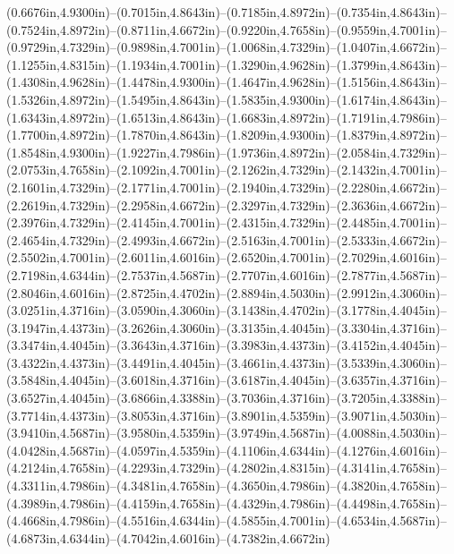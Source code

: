 (0.6676in,4.9300in)--(0.7015in,4.8643in)--(0.7185in,4.8972in)--(0.7354in,4.8643in)--(0.7524in,4.8972in)--(0.8711in,4.6672in)--(0.9220in,4.7658in)--(0.9559in,4.7001in)--(0.9729in,4.7329in)--(0.9898in,4.7001in)--(1.0068in,4.7329in)--(1.0407in,4.6672in)--(1.1255in,4.8315in)--(1.1934in,4.7001in)--(1.3290in,4.9628in)--(1.3799in,4.8643in)--(1.4308in,4.9628in)--(1.4478in,4.9300in)--(1.4647in,4.9628in)--(1.5156in,4.8643in)--(1.5326in,4.8972in)--(1.5495in,4.8643in)--(1.5835in,4.9300in)--(1.6174in,4.8643in)--(1.6343in,4.8972in)--(1.6513in,4.8643in)--(1.6683in,4.8972in)--(1.7191in,4.7986in)--(1.7700in,4.8972in)--(1.7870in,4.8643in)--(1.8209in,4.9300in)--(1.8379in,4.8972in)--(1.8548in,4.9300in)--(1.9227in,4.7986in)--(1.9736in,4.8972in)--(2.0584in,4.7329in)--(2.0753in,4.7658in)--(2.1092in,4.7001in)--(2.1262in,4.7329in)--(2.1432in,4.7001in)--(2.1601in,4.7329in)--(2.1771in,4.7001in)--(2.1940in,4.7329in)--(2.2280in,4.6672in)--(2.2619in,4.7329in)--(2.2958in,4.6672in)--(2.3297in,4.7329in)--(2.3636in,4.6672in)--(2.3976in,4.7329in)--(2.4145in,4.7001in)--(2.4315in,4.7329in)--(2.4485in,4.7001in)--(2.4654in,4.7329in)--(2.4993in,4.6672in)--(2.5163in,4.7001in)--(2.5333in,4.6672in)--(2.5502in,4.7001in)--(2.6011in,4.6016in)--(2.6520in,4.7001in)--(2.7029in,4.6016in)--(2.7198in,4.6344in)--(2.7537in,4.5687in)--(2.7707in,4.6016in)--(2.7877in,4.5687in)--(2.8046in,4.6016in)--(2.8725in,4.4702in)--(2.8894in,4.5030in)--(2.9912in,4.3060in)--(3.0251in,4.3716in)--(3.0590in,4.3060in)--(3.1438in,4.4702in)--(3.1778in,4.4045in)--(3.1947in,4.4373in)--(3.2626in,4.3060in)--(3.3135in,4.4045in)--(3.3304in,4.3716in)--(3.3474in,4.4045in)--(3.3643in,4.3716in)--(3.3983in,4.4373in)--(3.4152in,4.4045in)--(3.4322in,4.4373in)--(3.4491in,4.4045in)--(3.4661in,4.4373in)--(3.5339in,4.3060in)--(3.5848in,4.4045in)--(3.6018in,4.3716in)--(3.6187in,4.4045in)--(3.6357in,4.3716in)--(3.6527in,4.4045in)--(3.6866in,4.3388in)--(3.7036in,4.3716in)--(3.7205in,4.3388in)--(3.7714in,4.4373in)--(3.8053in,4.3716in)--(3.8901in,4.5359in)--(3.9071in,4.5030in)--(3.9410in,4.5687in)--(3.9580in,4.5359in)--(3.9749in,4.5687in)--(4.0088in,4.5030in)--(4.0428in,4.5687in)--(4.0597in,4.5359in)--(4.1106in,4.6344in)--(4.1276in,4.6016in)--(4.2124in,4.7658in)--(4.2293in,4.7329in)--(4.2802in,4.8315in)--(4.3141in,4.7658in)--(4.3311in,4.7986in)--(4.3481in,4.7658in)--(4.3650in,4.7986in)--(4.3820in,4.7658in)--(4.3989in,4.7986in)--(4.4159in,4.7658in)--(4.4329in,4.7986in)--(4.4498in,4.7658in)--(4.4668in,4.7986in)--(4.5516in,4.6344in)--(4.5855in,4.7001in)--(4.6534in,4.5687in)--(4.6873in,4.6344in)--(4.7042in,4.6016in)--(4.7382in,4.6672in) 